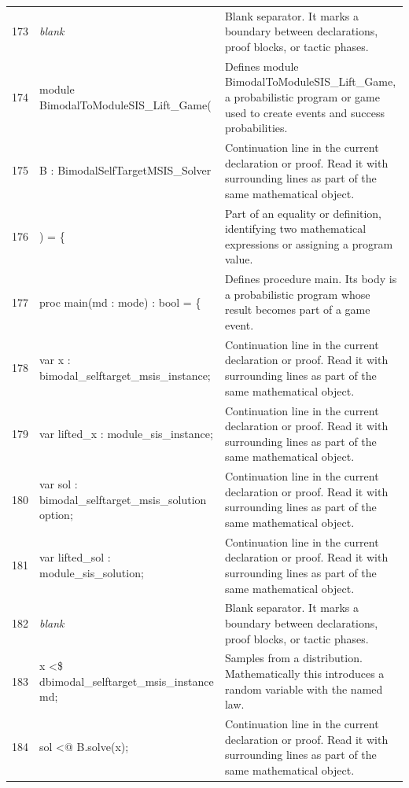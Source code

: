 \documentclass[10pt]{article}
\begin{document}
\begin{longtable}{r L{0.53\textwidth} L{0.37\textwidth}}
173 & {\ttfamily\scriptsize \emph{blank}} & Blank separator.  It marks a boundary between declarations, proof blocks, or tactic phases. \\
174 & {\ttfamily\scriptsize module BimodalToModuleSIS\_Lift\_Game(} & Defines module BimodalToModuleSIS\_Lift\_Game, a probabilistic program or game used to create events and success probabilities. \\
175 & {\ttfamily\scriptsize   B : BimodalSelfTargetMSIS\_Solver} & Continuation line in the current declaration or proof.  Read it with surrounding lines as part of the same mathematical object. \\
176 & {\ttfamily\scriptsize ) = \{} & Part of an equality or definition, identifying two mathematical expressions or assigning a program value. \\
177 & {\ttfamily\scriptsize   proc main(md : mode) : bool = \{} & Defines procedure main.  Its body is a probabilistic program whose result becomes part of a game event. \\
178 & {\ttfamily\scriptsize     var x : bimodal\_selftarget\_msis\_instance;} & Continuation line in the current declaration or proof.  Read it with surrounding lines as part of the same mathematical object. \\
179 & {\ttfamily\scriptsize     var lifted\_x : module\_sis\_instance;} & Continuation line in the current declaration or proof.  Read it with surrounding lines as part of the same mathematical object. \\
180 & {\ttfamily\scriptsize     var sol : bimodal\_selftarget\_msis\_solution option;} & Continuation line in the current declaration or proof.  Read it with surrounding lines as part of the same mathematical object. \\
181 & {\ttfamily\scriptsize     var lifted\_sol : module\_sis\_solution;} & Continuation line in the current declaration or proof.  Read it with surrounding lines as part of the same mathematical object. \\
182 & {\ttfamily\scriptsize \emph{blank}} & Blank separator.  It marks a boundary between declarations, proof blocks, or tactic phases. \\
183 & {\ttfamily\scriptsize     x <\$ dbimodal\_selftarget\_msis\_instance md;} & Samples from a distribution.  Mathematically this introduces a random variable with the named law. \\
184 & {\ttfamily\scriptsize     sol <@ B.solve(x);} & Continuation line in the current declaration or proof.  Read it with surrounding lines as part of the same mathematical object. \\

\end{longtable}
\end{document}
